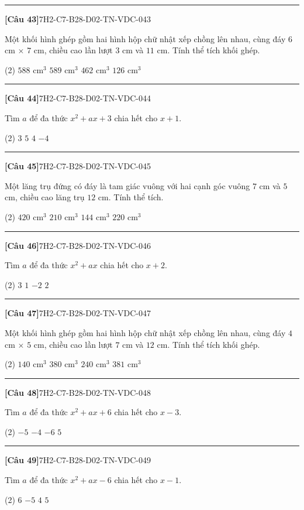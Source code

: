 \documentclass[12pt,a4paper]{article}
\newif\ifloigiai
\newenvironment{cauhoi}[2]{%
  \par\medskip\noindent\rule{\textwidth}{0.4pt}\par\nopagebreak
  \noindent\textbf{[#1]}\hfill{\scriptsize\ttfamily #2}\par\nopagebreak\smallskip}{\par}
\newcommand{\dapan}[1]{\ifloigiai\par\smallskip\noindent\textit{Đáp án:} \textbf{#1}\par\fi}
\begin{document}
\begin{cauhoi}{Câu 43}{7H2-C7-B28-D02-TN-VDC-043}
Một khối hình ghép gồm hai hình hộp chữ nhật xếp chồng lên nhau, cùng đáy $6$ cm $\times$ $7$ cm, chiều cao lần lượt $3$ cm và $11$ cm. Tính thể tích khối ghép.
\begin{tasks}(2)
\task $588\text{ cm}^3$
\task $589\text{ cm}^3$
\task $462\text{ cm}^3$
\task $126\text{ cm}^3$
\end{tasks}
\dapan{A}
\end{cauhoi}
\begin{cauhoi}{Câu 44}{7H2-C7-B28-D02-TN-VDC-044}
Tìm $a$ để đa thức $x^{2}+ax+3$ chia hết cho $x+1$.
\begin{tasks}(2)
\task $3$
\task $5$
\task $4$
\task $-4$
\end{tasks}
\dapan{C}
\end{cauhoi}
\begin{cauhoi}{Câu 45}{7H2-C7-B28-D02-TN-VDC-045}
Một lăng trụ đứng có đáy là tam giác vuông với hai cạnh góc vuông $7$ cm và $5$ cm, chiều cao lăng trụ $12$ cm. Tính thể tích.
\begin{tasks}(2)
\task $420\text{ cm}^3$
\task $210\text{ cm}^3$
\task $144\text{ cm}^3$
\task $220\text{ cm}^3$
\end{tasks}
\dapan{B}
\end{cauhoi}
\begin{cauhoi}{Câu 46}{7H2-C7-B28-D02-TN-VDC-046}
Tìm $a$ để đa thức $x^{2}+ax$ chia hết cho $x+2$.
\begin{tasks}(2)
\task $3$
\task $1$
\task $-2$
\task $2$
\end{tasks}
\dapan{D}
\end{cauhoi}
\begin{cauhoi}{Câu 47}{7H2-C7-B28-D02-TN-VDC-047}
Một khối hình ghép gồm hai hình hộp chữ nhật xếp chồng lên nhau, cùng đáy $4$ cm $\times$ $5$ cm, chiều cao lần lượt $7$ cm và $12$ cm. Tính thể tích khối ghép.
\begin{tasks}(2)
\task $140\text{ cm}^3$
\task $380\text{ cm}^3$
\task $240\text{ cm}^3$
\task $381\text{ cm}^3$
\end{tasks}
\dapan{B}
\end{cauhoi}
\begin{cauhoi}{Câu 48}{7H2-C7-B28-D02-TN-VDC-048}
Tìm $a$ để đa thức $x^{2}+ax+6$ chia hết cho $x-3$.
\begin{tasks}(2)
\task $-5$
\task $-4$
\task $-6$
\task $5$
\end{tasks}
\dapan{A}
\end{cauhoi}
\begin{cauhoi}{Câu 49}{7H2-C7-B28-D02-TN-VDC-049}
Tìm $a$ để đa thức $x^{2}+ax-6$ chia hết cho $x-1$.
\begin{tasks}(2)
\task $6$
\task $-5$
\task $4$
\task $5$
\end{tasks}
\dapan{D}
\end{cauhoi}
\end{document}
